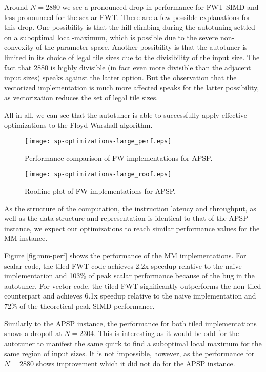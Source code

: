 Around $N = 2880$ we see a pronounced drop in performance for FWT-SIMD and less pronounced for the scalar FWT.
There are a few possible explanations for this drop. One possibility is that the hill-climbing during the autotuning
settled on a suboptimal local-maximum, which is possible due to the severe non-convexity of the parameter space.
Another possibility is that the autotuner is limited in its choice of legal tile sizes due to the divisibility of
the input size. The fact that 2880 is highly divisible (in fact even more divisible than the adjacent input sizes) speaks
against the latter option. But the observation that the vectorized implementation is much more affected speaks for the
latter possibility, as vectorization reduces the set of legal tile sizes.

All in all, we can see that the autotuner is able to successfully apply effective optimizations to the Floyd-Warshall
algorithm.

\begin{figure}[h]
    \centering
    \texttt{[image: sp-optimizations-large\_perf.eps]}
    \caption{Performance comparison of FW implementations for APSP.}
    \label{fig:sp-perf}
\end{figure}
\begin{figure}[h]
    \centering
    \texttt{[image: sp-optimizations-large\_roof.eps]}
    \caption{Roofline plot of FW implementations for APSP.}
    \label{fig:sp-roof}
\end{figure}


As the structure of the computation, the instruction latency and throughput, as well as the data structure and representation
is identical to that of the APSP instance, we expect our optimizations to reach similar performance values for the MM instance.

Figure \ref{fig:mm-perf} shows the performance of the MM implementations. For scalar code, the tiled FWT code achieves
2.2x speedup relative to the naive implementation and 103\% of peak scalar performance because of the bug in the autotuner.
For vector code, the tiled FWT significantly outperforms the non-tiled counterpart and achieves 6.1x speedup relative to
the naive implementation and 72\% of the theoretical peak SIMD performance. 

Similarly to the APSP instance, the performance for both tiled implementations shows a dropoff at $N = 2304$. This is interesting
as it would be odd for the autotuner to manifest the same quirk to find a suboptimal local maximum for the same region of
input sizes. It is not impossible, however, as the performance for $N = 2880$ shows improvement which it did not do
for the APSP instance.

